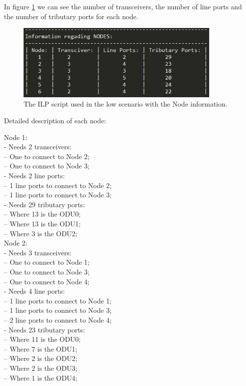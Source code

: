 In figure \ref{node_opaque_surv_ref_low}  we can see the number of transceivers, the number of line ports and the number of tributary ports for each node.\\

\begin{figure}[h!]
\centering
\includegraphics[width=10cm]{sdf/ilp/opaque_survivability/figures/node_opaque_surv_ref_low}
\caption{The ILP script used in the low scenario with the Node information.}
\label{node_opaque_surv_ref_low}
\end{figure}

Detailed description of each node:

Node 1:\\
- Needs 2 transceivers:\\
-- One to connect to Node 2;\\
-- One to connect to Node 3;\\
- Needs 2 line ports:\\
-- 1 line ports to connect to Node 2;\\
-- 1 line ports to connect to Node 3;\\
- Needs 29 tributary ports:\\
-- Where 13 is the ODU0;\\
-- Where 13 is the ODU1;\\
-- Where 3 is the ODU2;\\

Node 2:\\
- Needs 3 transceivers:\\
-- One to connect to Node 1;\\
-- One to connect to Node 3;\\
-- One to connect to Node 4;\\
- Needs 4 line ports:\\
-- 1 line ports to connect to Node 1;\\
-- 1 line ports to connect to Node 3;\\
-- 2 line ports to connect to Node 4;\\
- Needs 23 tributary ports:\\
-- Where 11 is the ODU0;\\
-- Where 7 is the ODU1;\\
-- Where 2 is the ODU2;\\
-- Where 2 is the ODU3;\\
-- Where 1 is the ODU4;\\

